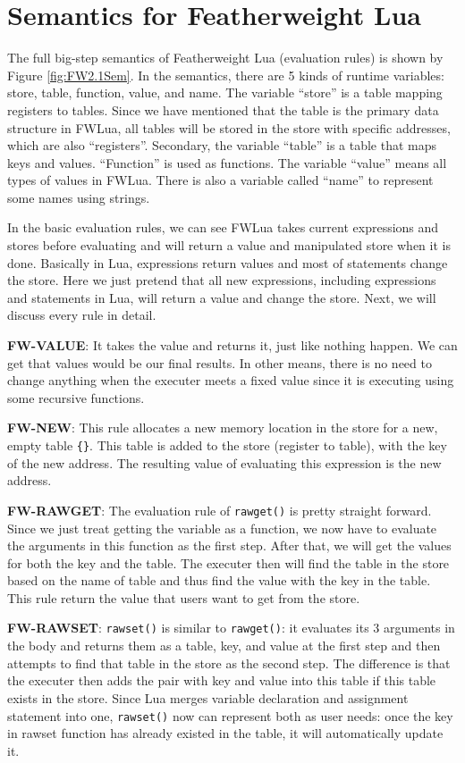 \section{Semantics for Featherweight Lua}\label{sec: FWLUAsemantic}
The full big-step semantics of Featherweight Lua (evaluation rules) is shown by Figure \ref{fig:FW2.1Sem}. In the semantics, there are 5 kinds of runtime variables: store, table, function, value, and name. The variable ``store'' is a table mapping registers to tables. Since we have mentioned that the table is the primary data structure in FWLua, all tables will be stored in the store with specific addresses, which are also ``registers''. Secondary, the variable ``table'' is a table that maps keys and values. ``Function'' is used as functions. The variable ``value'' means all types of values in FWLua. There is also a variable called ``name'' to represent some names using strings.

In the basic evaluation rules, we can see FWLua takes current expressions and stores before evaluating and will return a value and manipulated store when it is done. Basically in Lua, expressions return values and most of statements change the store. Here we just pretend that all new expressions, including expressions and statements in Lua, will return a value and change the store. Next, we will discuss every rule in detail.

{\bf FW-VALUE}: It takes the value and returns it, just like nothing happen. We can get that values would be our final results. In other means, there is no need to change anything when the executer meets a fixed value since it is executing using some recursive functions. 

{\bf FW-NEW}: This rule allocates a new memory location in the store for a new, empty table {\tt \{\}}. This table is added to the store (register to table), with the key of the new address.  The resulting value of evaluating this expression is the new address.

{\bf FW-RAWGET}: The evaluation rule of {\tt rawget()} is pretty straight forward. Since we just treat getting the variable as a function, we now have to evaluate the arguments in this function as the first step. After that, we will get the values for both the key and the table. The executer then will find the table in the store based on the name of table and thus find the value with the key in the table. This rule return the value that users want to get from the store.

{\bf FW-RAWSET}: {\tt rawset()} is similar to {\tt rawget()}: it evaluates its 3 arguments in the body and returns them as a table, key, and value at the first step and then attempts to find that table in the store as the second step. The difference is that the executer then adds the pair with key and value into this table if this table exists in the store. Since Lua merges variable declaration and assignment statement into one, {\tt rawset()} now can represent both as user needs: once the key in rawset function has already existed in the table, it will automatically update it.


